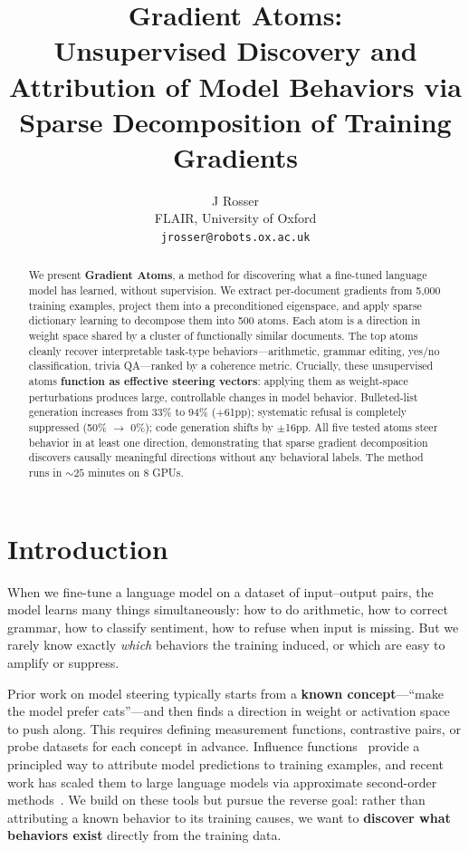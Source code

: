 \documentclass{article} %
\title{Gradient Atoms:\\Unsupervised Discovery and Attribution of Model Behaviors via Sparse Decomposition of Training Gradients
}
\author{
J Rosser \\
FLAIR, University of Oxford \\
\texttt{jrosser@robots.ox.ac.uk}
}
\begin{document}
\maketitle

\begin{abstract}
We present \textbf{Gradient Atoms}, a method for discovering what a fine-tuned language model has learned, without supervision. We extract per-document gradients from 5,000 training examples, project them into a preconditioned eigenspace, and apply sparse dictionary learning to decompose them into 500 atoms. Each atom is a direction in weight space shared by a cluster of functionally similar documents. The top atoms cleanly recover interpretable task-type behaviors---arithmetic, grammar editing, yes/no classification, trivia QA---ranked by a coherence metric. Crucially, these unsupervised atoms \textbf{function as effective steering vectors}: applying them as weight-space perturbations produces large, controllable changes in model behavior. Bulleted-list generation increases from 33\% to 94\% ($+$61pp); systematic refusal is completely suppressed (50\% $\to$ 0\%); code generation shifts by $\pm$16pp. All five tested atoms steer behavior in at least one direction, demonstrating that sparse gradient decomposition discovers causally meaningful directions without any behavioral labels. The method runs in ${\sim}25$ minutes on 8 GPUs.
\end{abstract}


\section{Introduction}

When we fine-tune a language model on a dataset of input--output pairs, the model learns many things simultaneously: how to do arithmetic, how to correct grammar, how to classify sentiment, how to refuse when input is missing. But we rarely know exactly \emph{which} behaviors the training induced, or which are easy to amplify or suppress.

Prior work on model steering typically starts from a \textbf{known concept}---``make the model prefer cats''---and then finds a direction in weight or activation space to push along. This requires defining measurement functions, contrastive pairs, or probe datasets for each concept in advance. Influence functions~\citep{cook1982residuals, koh2017understanding} provide a principled way to attribute model predictions to training examples, and recent work has scaled them to large language models via approximate second-order methods~\citep{grosse2023studying, source}. We build on these tools but pursue the reverse goal: rather than attributing a known behavior to its training causes, we want to \textbf{discover what behaviors exist} directly from the training data.
\end{document}
